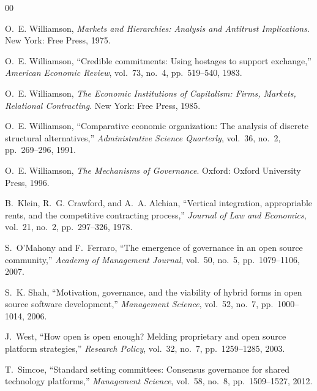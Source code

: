 \documentclass[conference]{IEEEtran}
\begin{document}
\begin{thebibliography}{00}

O.~E. Williamson, \textit{Markets and Hierarchies: Analysis and Antitrust
Implications}. New York: Free Press, 1975.

O.~E. Williamson, ``Credible commitments: Using hostages to support
exchange,'' \textit{American Economic Review}, vol.~73, no.~4,
pp.~519--540, 1983.

O.~E. Williamson, \textit{The Economic Institutions of Capitalism: Firms,
Markets, Relational Contracting}. New York: Free Press, 1985.

O.~E. Williamson, ``Comparative economic organization: The analysis of
discrete structural alternatives,'' \textit{Administrative Science
Quarterly}, vol.~36, no.~2, pp.~269--296, 1991.

O.~E. Williamson, \textit{The Mechanisms of Governance}. Oxford: Oxford
University Press, 1996.

B.~Klein, R.~G. Crawford, and A.~A. Alchian, ``Vertical integration,
appropriable rents, and the competitive contracting process,''
\textit{Journal of Law and Economics}, vol.~21, no.~2, pp.~297--326, 1978.

S.~O'Mahony and F.~Ferraro, ``The emergence of governance in an open source
community,'' \textit{Academy of Management Journal}, vol.~50, no.~5,
pp.~1079--1106, 2007.

S.~K. Shah, ``Motivation, governance, and the viability of hybrid forms in
open source software development,'' \textit{Management Science}, vol.~52,
no.~7, pp.~1000--1014, 2006.

J.~West, ``How open is open enough? Melding proprietary and open source
platform strategies,'' \textit{Research Policy}, vol.~32, no.~7,
pp.~1259--1285, 2003.

T.~Simcoe, ``Standard setting committees: Consensus governance for shared
technology platforms,'' \textit{Management Science}, vol.~58, no.~8,
pp.~1509--1527, 2012.


\end{thebibliography}
\end{document}
